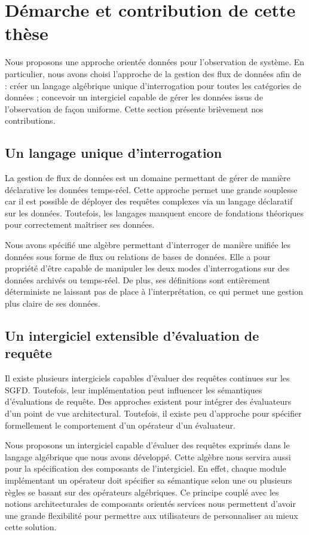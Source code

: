 \section{Démarche et contribution de cette thèse}\label{sec:intro:demarche}
Nous proposons une approche orientée données pour l'observation de système. En particulier, nous avons choisi l'approche de la gestion des flux de données afin de : créer un langage algébrique unique d'interrogation pour toutes les catégories de données ; concevoir un intergiciel capable de gérer les données issus de l'observation de façon uniforme. Cette section présente brièvement nos contributions.

\subsection{Un langage unique d'interrogation}
La gestion de flux de données est un domaine permettant de gérer de manière déclarative les données temps-réel. Cette approche permet une grande souplesse car il est possible de déployer des requêtes complexes via un langage déclaratif sur les données. Toutefois, les langages manquent encore de fondations théoriques pour correctement maîtriser ses données.

Nous avons spécifié une algèbre permettant d'interroger de manière unifiée les données sous forme de flux ou relations de bases de données. Elle a pour propriété d'être capable de manipuler les deux modes d'interrogations sur des données archivés ou temps-réel. De plus, ses définitions sont entièrement déterministe ne laissant pas de place à l'interprétation, ce qui permet une gestion plus claire de ses données.

\subsection{Un intergiciel extensible d'évaluation de requête}
Il existe plusieurs intergiciels capables d'évaluer des requêtes continues sur les SGFD. Toutefois, leur implémentation peut influencer les sémantiques d'évaluations de requête. Des approches existent pour intégrer des évaluateurs d'un point de vue architectural. Toutefois, il existe peu d'approche pour spécifier formellement le comportement d'un opérateur d'un évaluateur.

Nous proposons un intergiciel capable d'évaluer des requêtes exprimés dans le langage algébrique que nous avons développé. Cette algèbre nous servira aussi pour la spécification des composants de l'intergiciel. En effet, chaque module implémentant un opérateur doit spécifier sa sémantique selon une ou plusieurs règles se basant sur des opérateurs algébriques. Ce principe couplé avec les notions architecturales de composants orientés services nous permettent d'avoir une grande flexibilité pour permettre aux utilisateurs de personnaliser au mieux cette solution.

